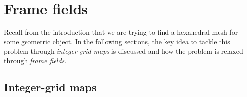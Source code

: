 \documentclass[../thesis.tex]{subfiles}
\begin{document}


\section{Frame fields}
Recall from the introduction that we are trying to find a hexahedral mesh
for some geometric object. In the following sections, the key idea to
tackle this problem through \emph{integer-grid maps} is discussed and
how the problem is relaxed through \emph{frame fields}.
\subsection{Integer-grid maps}
\end{document}
